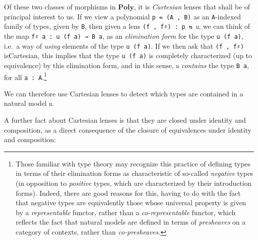 \documentclass[
  11pt,
  oneside,
  article]{memoir}
\theoremstyle{definition}
\theoremstyle{plain}
\newcommand{\Cat}[1]{\mathbf{#1}}%
\newcommand{\poly}{\Cat{Poly}}
\newcommand{\0}{\textsf{0}}
\newcommand{\1}{\tn{\textsf{1}}}
\begin{document}
Of these two classes of morphisms in \(\poly\), it is
\emph{Cartesian} lenses that shall be of principal interest to us. If we
view a polynomial \texttt{p\ =\ (A\ ,\ B)} as an \texttt{A}-indexed
family of types, given by \texttt{B}, then given a lens
\texttt{(f\ ,\ f♯)\ :\ p\ ⇆\ 𝔲}, we can think of the map
\texttt{f♯\ a\ :\ u\ (f\ a)\ →\ B\ a}, as an \emph{elimination form} for
the type \texttt{u\ (f\ a)}, i.e.~a way of \emph{using} elements of the
type \texttt{u\ (f\ a)}. If we then ask that \texttt{(f\ ,\ f♯)}
isCartesian, this implies that the type \texttt{u\ (f\ a)} is completely
characterized (up to equivalence) by this elimination form, and in this
sense, \texttt{𝔲} \emph{contains} the type \texttt{B\ a}, for all
\texttt{a\ :\ A}.\footnote{Those familiar with type theory may recognize
  this practice of defining types in terms of their elimination forms as
  characteristic of so-called \emph{negative} types (in opposition to
  \emph{positive} types, which are characterized by their introduction
  forms). Indeed, there are good reasons for this, having to do with the
  fact that negative types are equivalently those whose universal
  property is given by a \emph{representable} functor, rather than a
  \emph{co-representable} functor, which reflects the fact that natural
  models are defined in terms of \emph{presheaves} on a category of
  contexts, rather than \emph{co-presheaves.}}

We can therefore use Cartesian lenses to detect which types are
contained in a natural model \texttt{𝔲}.

A further fact about Cartesian lenses is that they are closed under
identity and composition, as a direct consequence of the closure of
equivalences under identity and composition:
\end{document}
